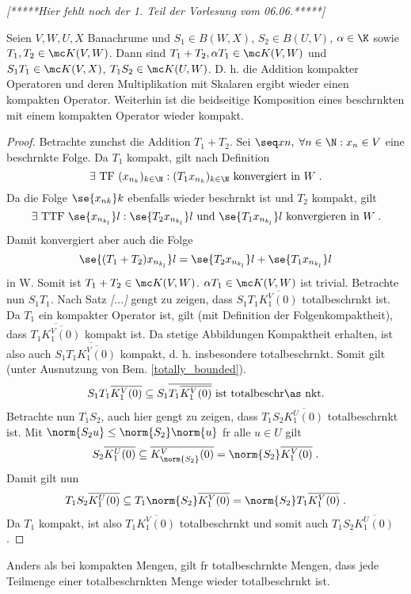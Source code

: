 \textit{[*****Hier fehlt noch der 1. Teil der Vorlesung vom 06.06.*****]}
\begin{theorem}
	Seien \(V,W, U, X\) Banachr\as ume und  \(S_1\in B(W,X)\), \(S_2\in B(U,V)\), \;\(\alpha \in \K\) sowie \(T_1, T_2\in \mc K(V,W)\). Dann sind \(T_1 + T_2, \alpha T_1 \in \mc K(V,W)\) und \(S_1 T_1\in \mc K(V,X)\), \(T_1S_2\in \mc K(U,W)\). D. h. die Addition kompakter Operatoren und deren Multiplikation mit Skalaren ergibt wieder einen kompakten Operator. Weiterhin ist die beidseitige Komposition eines beschr\as nkten mit einem kompakten Operator wieder kompakt.
\end{theorem}
\begin{proof}
	Betrachte zun\as chst die Addition \(T_1 + T_2\). Sei \(\seq xn,\; \forall n\in\N: x_n \in V\) eine beschr\as nkte Folge. Da $T_1$ kompakt, gilt nach Definition
	\[\exists \text{ TF } (x_{n_k})_{k\in\N}: (T_1 x_{n_k})_{k\in\N} \text{ konvergiert in } W\;.\]
	Da die Folge \(\se {x_{nk}}k\) ebenfalls wieder beschr\as nkt ist und $T_2$ kompakt, gilt
	\[\exists\text{ TTF } \se {x_{n_{k_l}}}l:  \se { T_2 x_{n_{k_l}}}l \text{ und } \se {T_ 1x_{n_{k_l}}}l \text{ konvergieren in }W \;.\]
	Damit konvergiert aber auch die Folge
	\[\se {(T_1 + T_2) x_{n_{k_l}}}l = \se { T_2 x_{n_{k_l}}}l + \se {T_ 1x_{n_{k_l}}}l \]
	in W. Somit ist \(T_1 + T_2 \in \mc K(V,W)\). \(\alpha T_1 \in \mc K(V,W)\) ist trivial. Betrachte nun \(S_1 T_1\). Nach Satz \textit{[...]}  gen\us gt zu zeigen, dass \(S_1 T_1 \overline{K_1^V(0)}\) totalbeschr\as nkt ist. Da $T_1$ ein kompakter Operator ist, gilt (mit Definition der Folgenkompaktheit), dass \(\overline{T_1\overline{K_1^V(0)}}\) kompakt ist. Da stetige Abbildungen Kompaktheit erhalten, ist also auch \(S_1 \overline{T_1\overline{K_1^V(0)}}\) kompakt, d. h. insbesondere totalbeschr\as nkt. Somit gilt (unter Ausnutzung von Bem. \ref{totally_bounded}).
	\[S_1 T_1 \overline{K_1^V(0)} \subseteq S_1\overline{T_1\overline{K_1^V(0)}} \text{ ist totalbeschr\as nkt.}\]
	Betrachte nun \(T_1S_2\), auch hier gen\us gt zu zeigen, dass \(T_1S_2 \overline{K_1^U(0)}\) totalbeschr\as nkt ist. Mit \(\norm {S_2 u} \leq \norm{S_2}\norm{u}\) f\us r alle \(u\in U\) gilt
	\[S_2 \overline{K_1^U(0)} \subseteq \overline{K_{\norm{S_2}}^V(0)} = \norm{S_2} \overline{K_1^V(0)}\;.\]
	Damit gilt nun 
	\[T_1S_2 \overline{K_1^U(0)} \subseteq T_1\norm{S_2} \overline{K_1^V(0)} = \norm{S_2} T_1\overline{K_1^V(0)}\;.\]
	Da $T_1$ kompakt, ist also \(T_1 \overline{K_1^V(0)}\) totalbeschr\as nkt und somit auch \(T_1S_2\overline{K_1^U(0)}\).
\end{proof}
\begin{rem}
	\label{totally_bounded}
	Anders als bei kompakten Mengen, gilt f\us r totalbeschr\as nkte Mengen, dass jede Teilmenge einer totalbeschr\as nkten Menge wieder totalbeschr\as nkt ist.
\end{rem}

